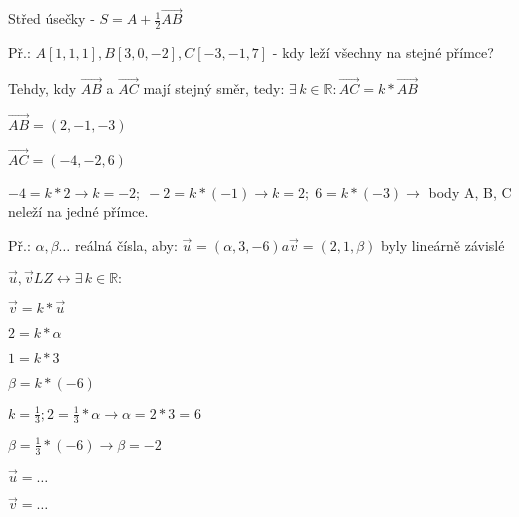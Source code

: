 \documentclass[12pt, a4paper]{scrartcl}
\begin{document}
    Střed úsečky - $S = A + \frac{1}{2}\overrightarrow{AB}$

    Př.: $A[1, 1, 1], B[3, 0, -2], C[-3, -1, 7]$ - kdy leží všechny na stejné přímce?

    Tehdy, kdy $\overrightarrow{AB}$ a $\overrightarrow{AC}$ mají stejný směr, tedy: $\exists\, k \in \mathds{R}: \overrightarrow{AC} = k * \overrightarrow{AB}$

    $\overrightarrow{AB} = (2, -1, -3)$

    $\overrightarrow{AC} = (-4, -2, 6)$

    $-4 = k * 2 \rightarrow k = -2;\;-2 = k * (-1) \rightarrow k = 2;\;6 = k * (-3) \rightarrow$ body A, B, C neleží na jedné přímce.

    Př.: $\alpha, \beta \dots$ reálná čísla, aby: $\overrightarrow{u} = (\alpha , 3, -6) a \overrightarrow{v} = (2 , 1, \beta)$ byly lineárně závislé

    $\overrightarrow{u}, \overrightarrow{v} LZ \leftrightarrow \exists\, k \in \mathds{R}:$
    
    $\overrightarrow{v} = k * \overrightarrow{u}$

    $2 = k * \alpha$

    $1 = k * 3$

    $\beta = k * (-6)$

    $k = \frac{1}{3}; 2 = \frac{1}{3} * \alpha \rightarrow \alpha = 2 * 3 = 6$

    $\beta = \frac{1}{3} * (-6) \rightarrow \beta = -2$

    $\overrightarrow{u} = \dots$

    $\overrightarrow{v} = \dots$
\end{document}
